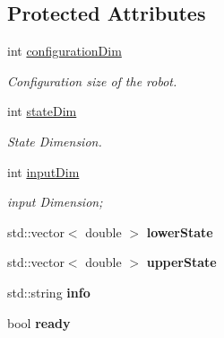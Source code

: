 \subsection*{Protected Attributes}
\begin{DoxyCompactItemize}
\item 
int \hyperlink{classvpRobot_a9dfa07bcea3214993ddcbc50b4d96dde}{configuration\+Dim}\hypertarget{classvpRobot_a9dfa07bcea3214993ddcbc50b4d96dde}{}\label{classvpRobot_a9dfa07bcea3214993ddcbc50b4d96dde}

\begin{DoxyCompactList}\small\item\em Configuration size of the robot. \end{DoxyCompactList}\item 
int \hyperlink{classvpRobot_af0367fab21b8c5b50d6e887805d85169}{state\+Dim}\hypertarget{classvpRobot_af0367fab21b8c5b50d6e887805d85169}{}\label{classvpRobot_af0367fab21b8c5b50d6e887805d85169}

\begin{DoxyCompactList}\small\item\em State Dimension. \end{DoxyCompactList}\item 
int \hyperlink{classvpRobot_abc5e62aa154f90d0556d67b4db577967}{input\+Dim}\hypertarget{classvpRobot_abc5e62aa154f90d0556d67b4db577967}{}\label{classvpRobot_abc5e62aa154f90d0556d67b4db577967}

\begin{DoxyCompactList}\small\item\em input Dimension; \end{DoxyCompactList}\item 
std\+::vector$<$ double $>$ {\bfseries lower\+State}\hypertarget{classvpRobot_a616e0d486e57bd07b5b8d17ee38efcba}{}\label{classvpRobot_a616e0d486e57bd07b5b8d17ee38efcba}

\item 
std\+::vector$<$ double $>$ {\bfseries upper\+State}\hypertarget{classvpRobot_afc811f86ed4da5ce8351601f0b5f2af1}{}\label{classvpRobot_afc811f86ed4da5ce8351601f0b5f2af1}

\item 
std\+::string {\bfseries info}\hypertarget{classvpRobot_a4b3f95d0db1f1d61c89bbcb5e6606780}{}\label{classvpRobot_a4b3f95d0db1f1d61c89bbcb5e6606780}

\item 
bool {\bfseries ready}\hypertarget{classvpRobot_a9be1d7f1a992a63ba5c4b28a610b7bda}{}\label{classvpRobot_a9be1d7f1a992a63ba5c4b28a610b7bda}


\end{DoxyCompactItemize}
